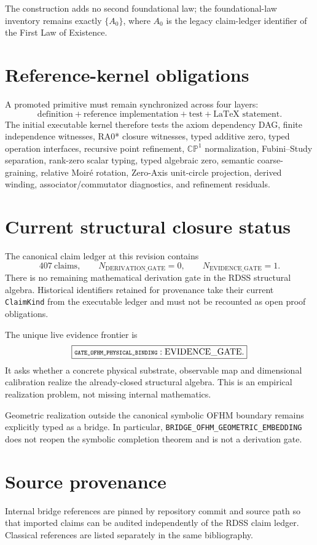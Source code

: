 \documentclass[11pt]{article}
\newcommand{\CP}{\mathbb{CP}^{1}}
\newcommand{\claimid}[1]{\nolinkurl{#1}}
\newcommand{\claimidmath}[1]{\mbox{\scriptsize\ttfamily\detokenize{#1}}}
\begin{document}
The construction adds no second foundational law; the foundational-law
inventory remains exactly \(\{A_0\}\), where \(A_0\) is the legacy
claim-ledger identifier of the First Law of Existence.

\section{Reference-kernel obligations}

A promoted primitive must remain synchronized across four layers:
\[
\boxed{
\text{definition}
+\text{reference implementation}
+\text{test}
+\text{LaTeX statement}.
}
\]
The initial executable kernel therefore tests the axiom dependency DAG, finite independence witnesses, RA0* closure witnesses, typed additive zero, typed operation interfaces, recursive point refinement,
\(\CP\) normalization, Fubini--Study separation, rank-zero scalar typing,
typed algebraic zero, semantic coarse-graining, relative Moir\'e rotation,
Zero-Axis unit-circle projection, derived winding, associator/commutator
diagnostics, and refinement residuals.

\section*{Current structural closure status}

The canonical claim ledger at this revision contains
\[
\boxed{407\ \text{claims}},
\qquad
\boxed{N_{\mathrm{DERIVATION\_GATE}}=0},
\qquad
\boxed{N_{\mathrm{EVIDENCE\_GATE}}=1}.
\]
There is no remaining mathematical derivation gate in the RDSS structural
algebra. Historical identifiers retained for provenance take their current
\texttt{ClaimKind} from the executable ledger and must not be recounted as
open proof obligations.

The unique live evidence frontier is
\[
\boxed{
\claimidmath{GATE_OFHM_PHYSICAL_BINDING}
:
\mathrm{EVIDENCE\_GATE}.
}
\]
It asks whether a concrete physical substrate, observable map and dimensional
calibration realize the already-closed structural algebra. This is an empirical
realization problem, not missing internal mathematics.

Geometric realization outside the canonical symbolic OFHM boundary remains
explicitly typed as a bridge. In particular,
\claimid{BRIDGE_OFHM_GEOMETRIC_EMBEDDING} does not reopen the symbolic
completion theorem and is not a derivation gate.

\section*{Source provenance}
Internal bridge references are pinned by repository commit and source path so
that imported claims can be audited independently of the RDSS claim ledger.
Classical references are listed separately in the same bibliography.
\end{document}
